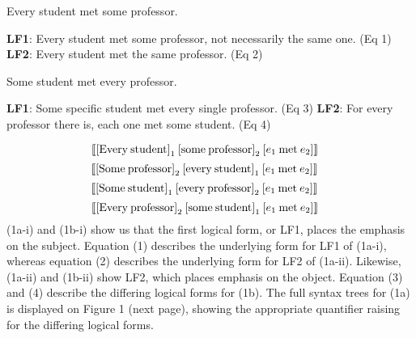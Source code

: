 \documentclass[english, 11pt]{article}
\begin{document}
\begin {exe}
	\ex 
		\begin {xlist}
			\ex Every student met some professor.
			\begin {xlist} 
				\ex \textbf{LF1}: Every student met some professor, not necessarily the same one. (Eq 1)
				\ex \textbf{LF2}: Every student met the same professor. (Eq 2)
			\end {xlist}
			\ex Some student met every professor.
				\begin {xlist} 
					\ex \textbf{LF1}: Some specific student met every single professor. (Eq 3)
					\ex \textbf{LF2}: For every professor there is, each one met some student. (Eq 4)
				\end {xlist}
	\end {xlist}
\end {exe}
\begin{equation}
	\llbracket  \text{[Every\:student]}_{1}\:\text{[some\:professor]}_{2}\:[e_{1}\:\text{met}\:e_{2}] \rrbracket \quad
\end{equation}
\begin{equation}
	\llbracket  \text{[Some\:professor]}_{2}\:\text{[every\:student]}_{1}\:[e_{1}\:\text{met}\:e_{2}] \rrbracket \quad
\end{equation}
\begin{equation}
	\llbracket  \text{[Some\:student]}_{1}\:\text{[every\:professor]}_{2}\:[e_{1}\:\text{met}\:e_{2}] \rrbracket \quad
\end{equation}
\begin{equation}
	\llbracket  \text{[Every\:professor]}_{2}\:\text{[some\:student]}_{1}\:[e_{1}\:\text{met}\:e_{2}] \rrbracket \quad
\end{equation}
(1a-i) and (1b-i) show us that the first logical form, or LF1, places the emphasis on the subject. Equation (1) describes the underlying form for LF1 of (1a-i), whereas equation (2) describes the underlying form for LF2 of (1a-ii). Likewise, (1a-ii) and (1b-ii) show LF2, which places emphasis on the object. Equation (3) and (4) describe the differing logical forms for (1b). The full syntax trees for (1a) is displayed on Figure 1 (next page), showing the appropriate quantifier raising for the differing logical forms. 
\end{document}
